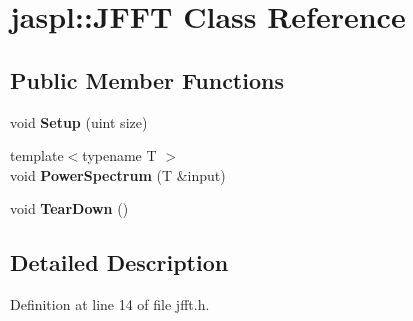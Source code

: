 \hypertarget{classjaspl_1_1_j_f_f_t}{}\section{jaspl\+:\+:J\+F\+FT Class Reference}
\label{classjaspl_1_1_j_f_f_t}
\subsection*{Public Member Functions}
\begin{DoxyCompactItemize}
\item 
void {\bfseries Setup} (uint size)\hypertarget{classjaspl_1_1_j_f_f_t_a9ae772905c4f41a2de1c8b62683f6b5e}{}\label{classjaspl_1_1_j_f_f_t_a9ae772905c4f41a2de1c8b62683f6b5e}

\item 
{\footnotesize template$<$typename T $>$ }\\void {\bfseries Power\+Spectrum} (T \&input)\hypertarget{classjaspl_1_1_j_f_f_t_a3953d73759cf17cb93f2b1e76691a8fe}{}\label{classjaspl_1_1_j_f_f_t_a3953d73759cf17cb93f2b1e76691a8fe}

\item 
void {\bfseries Tear\+Down} ()\hypertarget{classjaspl_1_1_j_f_f_t_a7ba090708a0e3b6e1dba81574fa52548}{}\label{classjaspl_1_1_j_f_f_t_a7ba090708a0e3b6e1dba81574fa52548}

\end{DoxyCompactItemize}


\subsection{Detailed Description}


Definition at line 14 of file jfft.\+h.

